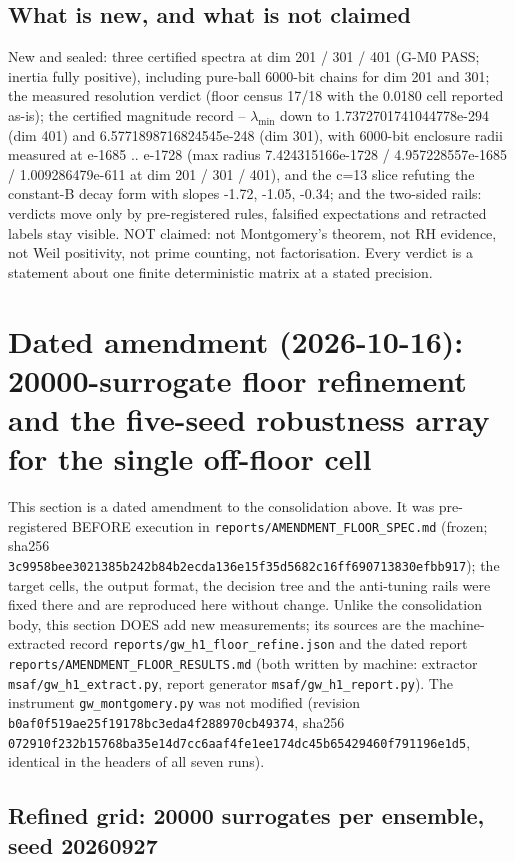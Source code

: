 \documentclass[11pt]{article}
\begin{document}
\subsection{What is new, and what is not claimed}
New and sealed: three certified spectra at dim 201 / 301 / 401 (G-M0
PASS; inertia fully positive), including pure-ball 6000-bit chains for
dim 201 and 301; the measured resolution verdict (floor census 17/18
with the 0.0180 cell reported as-is); the certified magnitude record --
$\lambda_{\min}$ down to 1.7372701741044778e-294 (dim 401) and
6.5771898716824545e-248 (dim 301), with 6000-bit enclosure radii
measured at e-1685 .. e-1728 (max radius 7.424315166e-1728 /
4.957228557e-1685 / 1.009286479e-611 at dim 201 / 301 / 401), and the
c=13 slice refuting the constant-B decay form with slopes -1.72, -1.05,
-0.34; and the two-sided rails: verdicts move only by pre-registered
rules, falsified expectations and retracted labels stay visible.
NOT claimed: not Montgomery's theorem, not RH evidence, not Weil
positivity, not prime counting, not factorisation. Every verdict is a
statement about one finite deterministic matrix at a stated precision.

\section{Dated amendment (2026-10-16): 20000-surrogate floor refinement
and the five-seed robustness array for the single off-floor cell}

This section is a dated amendment to the consolidation above. It was
pre-registered BEFORE execution in \texttt{reports/AMENDMENT\_FLOOR\_SPEC.md}
(frozen; sha256
\texttt{3c9958bee3021385b242b84b2ecda136e15f35d5682c16ff690713830efbb917});
the target cells, the output format, the decision tree and the
anti-tuning rails were fixed there and are reproduced here without
change. Unlike the consolidation body, this section DOES add new
measurements; its sources are the machine-extracted record
\texttt{reports/gw\_h1\_floor\_refine.json} and the dated report
\texttt{reports/AMENDMENT\_FLOOR\_RESULTS.md} (both written by machine:
extractor \texttt{msaf/gw\_h1\_extract.py}, report generator
\texttt{msaf/gw\_h1\_report.py}). The instrument \texttt{gw\_montgomery.py}
was not modified (revision \texttt{b0af0f519ae25f19178bc3eda4f288970cb49374},
sha256 \texttt{072910f232b15768ba35e14d7cc6aaf4fe1ee174dc45b65429460f791196e1d5},
identical in the headers of all seven runs).

\subsection{Refined grid: 20000 surrogates per ensemble, seed 20260927}
\end{document}
